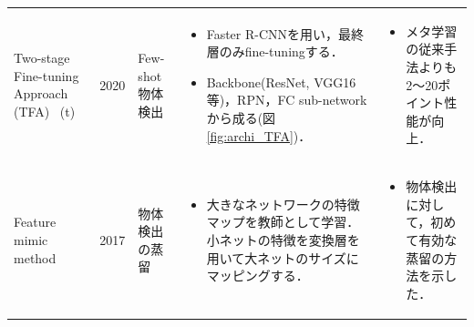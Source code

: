 \documentclass[twocolumn]{jsarticle} %
\begin{document}
\begin{table}
\begin{center}
\begin{tabularx}{\linewidth}{XcXp{7cm}X}
            Two-stage Fine-tuning Approach (TFA) \cite{WHGDY20} \ (t) 
            \vspace{0.7\baselineskip}
            & 2020 & Few-shot 物体検出 & 
            \begin{itemize}
                \vspace{-0.7\baselineskip}
                \setlength{\leftskip}{-3mm}
                \item Faster R-CNNを用い，最終層のみfine-tuningする．
                \item Backbone(ResNet, VGG16等)，RPN，FC sub-networkから成る(図\ref{fig:archi_TFA})．
            \end{itemize}
            &
            \begin{itemize}
                \vspace{-0.7\baselineskip}
                \setlength{\leftskip}{-3mm}
                \item メタ学習の従来手法よりも2〜20ポイント性能が向上．
            \end{itemize}
            \\

            Feature mimic method \cite{LJY17} & 2017 & 物体検出の蒸留 & 
            \begin{itemize}
                \vspace{-0.7\baselineskip}
                \setlength{\leftskip}{-3mm}
                \item 大きなネットワークの特徴マップを教師として学習．小ネットの特徴を変換層を用いて大ネットのサイズにマッピングする．
            \end{itemize}
            & 
            \begin{itemize}
                \vspace{-0.7\baselineskip}
                \setlength{\leftskip}{-3mm}
                \item 物体検出に対して，初めて有効な蒸留の方法を示した．
            \end{itemize}
            \\


\end{tabularx}
\end{center}
\end{table}
\end{document}
